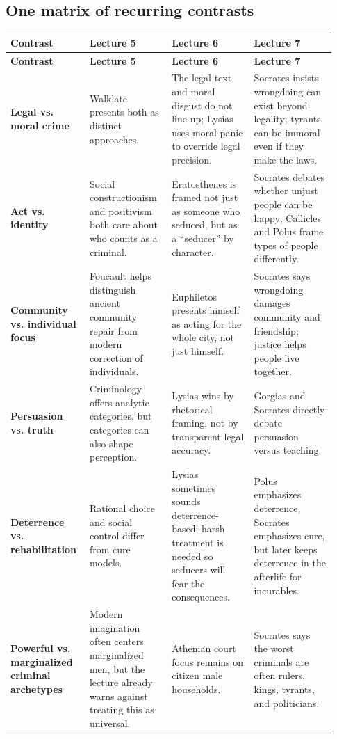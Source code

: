 \documentclass[11pt]{article}
\begin{document}
\subsection*{One matrix of recurring contrasts}

\begin{longtable}{@{}p{0.21\linewidth}p{0.24\linewidth}p{0.24\linewidth}p{0.24\linewidth}@{}}
\toprule
\textbf{Contrast} & \textbf{Lecture 5} & \textbf{Lecture 6} & \textbf{Lecture 7} \\
\midrule
\endfirsthead
\toprule
\textbf{Contrast} & \textbf{Lecture 5} & \textbf{Lecture 6} & \textbf{Lecture 7} \\
\midrule
\endhead
\textbf{Legal vs. moral crime} & Walklate presents both as distinct approaches. & The legal text and moral disgust do not line up; Lysias uses moral panic to override legal precision. & Socrates insists wrongdoing can exist beyond legality; tyrants can be immoral even if they make the laws. \\
\textbf{Act vs. identity} & Social constructionism and positivism both care about who counts as a criminal. & Eratosthenes is framed not just as someone who seduced, but as a ``seducer'' by character. & Socrates debates whether unjust people can be happy; Callicles and Polus frame types of people differently. \\
\textbf{Community vs. individual focus} & Foucault helps distinguish ancient community repair from modern correction of individuals. & Euphiletos presents himself as acting for the whole city, not just himself. & Socrates says wrongdoing damages community and friendship; justice helps people live together. \\
\textbf{Persuasion vs. truth} & Criminology offers analytic categories, but categories can also shape perception. & Lysias wins by rhetorical framing, not by transparent legal accuracy. & Gorgias and Socrates directly debate persuasion versus teaching. \\
\textbf{Deterrence vs. rehabilitation} & Rational choice and social control differ from cure models. & Lysias sometimes sounds deterrence-based: harsh treatment is needed so seducers will fear the consequences. & Polus emphasizes deterrence; Socrates emphasizes cure, but later keeps deterrence in the afterlife for incurables. \\
\textbf{Powerful vs. marginalized criminal archetypes} & Modern imagination often centers marginalized men, but the lecture already warns against treating this as universal. & Athenian court focus remains on citizen male households. & Socrates says the worst criminals are often rulers, kings, tyrants, and politicians. \\
\bottomrule
\end{longtable}
\end{document}
